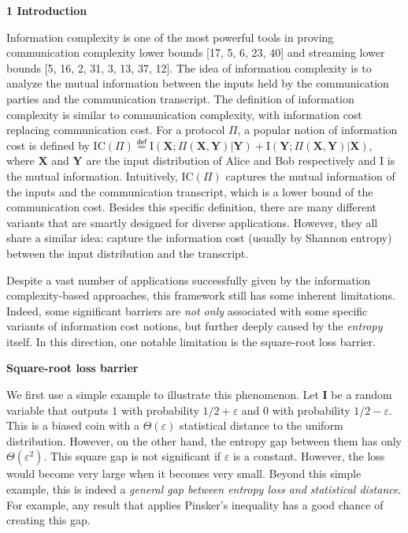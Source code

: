 

\par\medskip\noindent\textbf{
1 Introduction}\par




Information complexity is one of the most powerful tools in proving communication complexity lower bounds [17, 5, 6, 23, 40] and streaming lower bounds [5, 16, 2, 31, 3, 13, 37, 12]. The idea of information complexity is to analyze the mutual information between the inputs held by the communication parties and the communication transcript. The definition of information complexity is similar to communication complexity, with information cost replacing communication cost. For a protocol $\Pi$, a popular notion of information cost is defined by
$\text{IC}(\Pi)\stackrel{{\scriptstyle\mathsf{def}}}{{=}}\text{I}(\bm{X};\Pi(\bm{X},\bm{Y})|\bm{Y})+\text{I}(\bm{Y};\Pi(\bm{X},\bm{Y})|\bm{X})$, where $\bm{X}$ and $\bm{Y}$ are the input distribution of Alice and Bob respectively and I is the mutual information. Intuitively, $\text{IC}(\Pi)$ captures the mutual information of the inputs and the communication transcript, which is a lower bound of the communication cost. Besides this specific definition, there are many different variants that are smartly designed for diverse applications. However, they all share a similar idea: capture the information cost (usually by Shannon entropy) between the input distribution and the transcript.\par




Despite a vast number of applications successfully given by the information complexity-based approaches, this framework still has some inherent limitations. Indeed, some significant barriers are \emph{not only} associated with some specific variants of information cost notions, but further deeply caused by the \emph{entropy} itself. In this direction, one notable limitation is the square-root loss barrier.\par




\par\medskip\noindent\textbf{Square-root loss barrier}\par




We first use a simple example to illustrate this phenomenon. Let $\bm{I}$ be a random variable that outputs $1$ with probability $1/2+\varepsilon$ and $0$ with probability $1/2-\varepsilon$. This is a biased coin with a $\Theta(\varepsilon)$ statistical distance to the uniform distribution. However, on the other hand, the entropy gap between them has only $\Theta(\varepsilon^{2})$. This square gap is not significant if $\varepsilon$ is a constant. However, the loss would become very large when it becomes very small. Beyond this simple example, this is indeed a \emph{general gap between entropy loss and statistical distance}. For example, any result that applies Pinsker’s inequality has a good chance of creating this gap.\par



